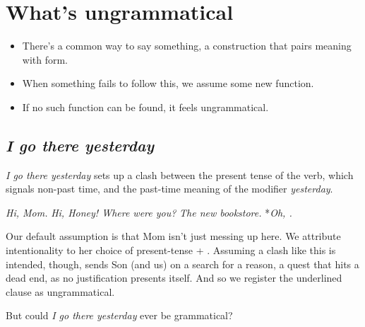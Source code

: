 \chapter{What's ungrammatical}


\begin{itemize}
    \item There's a common way to say something, a construction that pairs meaning with form.
    \item When something fails to follow this, we assume some new function.
    \item If no such function can be found, it feels ungrammatical.
\end{itemize}



\section{\textit{I go there yesterday}}

\textit{I go there yesterday} sets up a clash between the present tense of the verb, which signals non-past time, and the past-time meaning of the modifier \textit{yesterday}.

\ea\label{ex:go-yesterday-clash}
    \begin{dialogue}
         \phantom{..*}\textit{Hi, Mom.}
         \phantom{*}\textit{Hi, Honey! Where were you?}
         \phantom{..*}\textit{The new bookstore.}
         *\textit{Oh, .}
    \end{dialogue}
\z

Our default assumption is that Mom isn't just messing up here. We attribute intentionality to her choice of present-tense  + . Assuming a clash like this is intended, though, sends Son (and us) on a search for a reason, a quest that hits a dead end, as no justification presents itself. And so we register the underlined clause as ungrammatical.


But could \textit{I go there yesterday} ever be grammatical?


